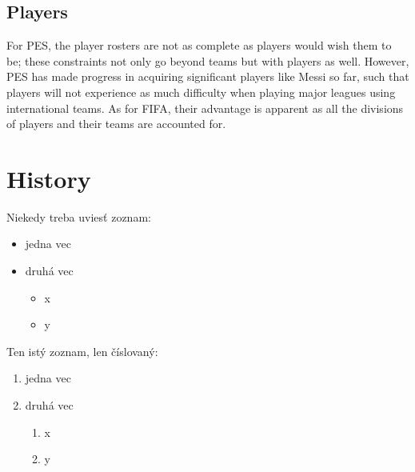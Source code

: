 \documentclass[12pt,twoside,english,a4paper]{article}
\begin{document}
\subsection{Players} \label{aspects: players}
For PES, the player rosters are not as complete as players would wish them to be; these constraints not only go beyond teams but with players as well. However, PES has made progress in acquiring significant players like Messi so far, such that players will not experience as much difficulty when playing major leagues using international teams. As for FIFA, their advantage is apparent as all the divisions of players and their teams are accounted for. \cite{Stealthoptional.com}

\section{History} \label{history}

Niekedy treba uviesť zoznam:

\begin{itemize}
\item jedna vec
\item druhá vec
	\begin{itemize}
	\item x
	\item y
	\end{itemize}
\end{itemize}

Ten istý zoznam, len číslovaný:

\begin{enumerate}
\item jedna vec
\item druhá vec
	\begin{enumerate}
	\item x
	\item y
	\end{enumerate}
\end{enumerate}




\end{document}
